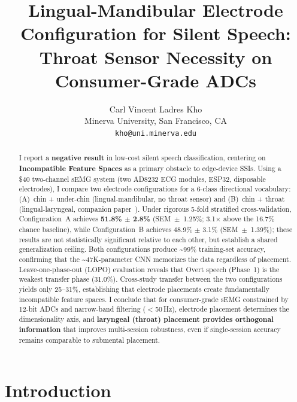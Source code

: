 \documentclass{article}
\date{}
\title{Lingual-Mandibular Electrode Configuration for Silent Speech:\\Throat Sensor Necessity on Consumer-Grade ADCs}
\author{
  Carl Vincent Ladres Kho \\
  Minerva University, San Francisco, CA \\
  \texttt{kho@uni.minerva.edu} \\
}
\begin{document}
\maketitle

\begin{abstract}
I report a \textbf{negative result} in low-cost silent speech classification, centering on \textbf{Incompatible Feature Spaces} as a primary obstacle to edge-device SSIs. Using a \$40 two-channel sEMG system (two AD8232 ECG modules, ESP32, disposable electrodes), I compare two electrode configurations for a 6-class directional vocabulary: (A)~chin + under-chin (lingual-mandibular, no throat sensor) and (B)~chin + throat (lingual-laryngeal, companion paper~\cite{kho2026companion}). Under rigorous 5-fold stratified cross-validation, Configuration~A achieves \textbf{51.8\% $\pm$ 2.8\%} (SEM~$\pm$~1.25\%; 3.1$\times$ above the 16.7\% chance baseline), while Configuration~B achieves 48.9\% $\pm$ 3.1\% (SEM~$\pm$~1.39\%); these results are not statistically significant relative to each other, but establish a shared generalization ceiling. Both configurations produce \textasciitilde99\% training-set accuracy, confirming that the \textasciitilde47K-parameter CNN memorizes the data regardless of placement. Leave-one-phase-out (LOPO) evaluation reveals that Overt speech (Phase~1) is the weakest transfer phase (31.0\%). Cross-study transfer between the two configurations yields only 25--31\%, establishing that electrode placements create fundamentally incompatible feature spaces. I conclude that for consumer-grade sEMG constrained by 12-bit ADCs and narrow-band filtering ($<$50\,Hz), electrode placement determines the dimensionality axis, and \textbf{laryngeal (throat) placement provides orthogonal information} that improves multi-session robustness, even if single-session accuracy remains comparable to submental placement.
\end{abstract}


\section{Introduction}
\end{document}
